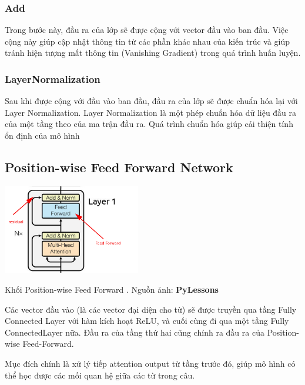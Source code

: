 \documentclass[a4paper, 10pt]{article}
\begin{document}
\subsubsection{Add}
Trong bước này, đầu ra của lớp sẽ được cộng với vector 
đầu vào ban đầu. Việc cộng này giúp cập nhật thông tin từ các phần khác nhau của kiến 
trúc và giúp tránh hiện tượng mất thông tin (Vanishing Gradient) trong quá trình huấn 
luyện.

\subsubsection{LayerNormalization}
Sau khi được cộng với đầu vào ban đầu, đầu ra của lớp sẽ được chuẩn hóa lại với
Layer Normalization. Layer Normalization là một phép chuẩn hóa dữ liệu đầu ra của
một tầng theo của ma trận đầu ra. Quá 
trình chuẩn hóa giúp cải thiện tính ổn định của mô hình 

\subsection{Position-wise Feed Forward Network}
\begin{minipage}{\linewidth}
    \captionsetup{type=figure}
    \centering
    \includegraphics[width=6cm]{./feed-forward-sublayer-in-transformer.png}
    \caption{Khối Position-wise Feed Forward . Nguồn ảnh: \textbf{PyLessons}}
\end{minipage}

Các vector đầu vào (là các vector đại diện cho từ) sẽ được truyền qua tầng Fully Connected Layer với hàm kích hoạt ReLU, và cuối cùng đi qua một tầng Fully ConnectedLayer nữa.
Đầu ra của tầng thứ hai cũng chính ra đầu ra của Position-wise Feed-Forward. 

Mục đích chính là xử lý tiếp attention output từ tầng trước đó, giúp mô hình có thể học được các mối quan hệ giữa các từ trong câu.
\end{document}
